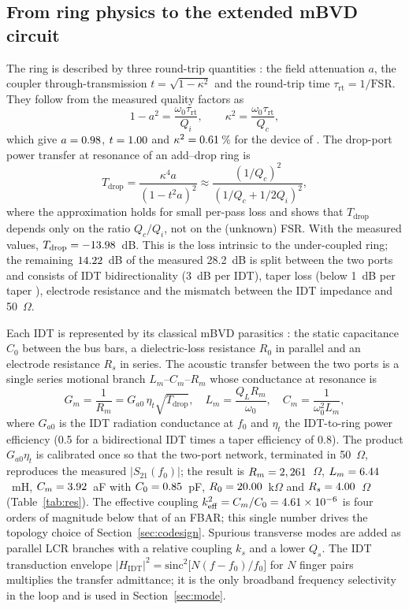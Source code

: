 \documentclass[journal]{IEEEtran}
\begin{document}
\subsection{From ring physics to the extended mBVD circuit}
The ring is described by three round-trip quantities \cite{yariv2000}: the field attenuation $a$, the coupler through-transmission $t=\sqrt{1-\kappa^2}$ and the round-trip time $\tau_{\mathrm{rt}}=1/\mathrm{FSR}$. They follow from the measured quality factors as
\begin{equation}
1-a^2=\frac{\omega_0\tau_{\mathrm{rt}}}{Q_i},\qquad \kappa^2=\frac{\omega_0\tau_{\mathrm{rt}}}{Q_c},
\label{eq:rt}
\end{equation}
which give $a=0.98$, $t=1.00$ and $\kappa^2=0.61$\,\% for the device of \cite{ji2026}. The drop-port power transfer at resonance of an add--drop ring is
\begin{equation}
T_{\mathrm{drop}}=\frac{\kappa^4 a}{(1-t^2a)^2}\approx\frac{(1/Q_c)^2}{(1/Q_c+1/2Q_i)^2},
\label{eq:tdrop}
\end{equation}
where the approximation holds for small per-pass loss and shows that $T_{\mathrm{drop}}$ depends only on the ratio $Q_c/Q_i$, not on the (unknown) FSR. With the measured values, $T_{\mathrm{drop}}=-13.98$~dB. This is the loss intrinsic to the under-coupled ring; the remaining $14.22$~dB of the measured 28.2~dB is split between the two ports and consists of IDT bidirectionality (3~dB per IDT), taper loss (below 1~dB per taper \cite{ji2026}), electrode resistance and the mismatch between the IDT impedance and 50~$\Omega$.

Each IDT is represented by its classical mBVD parasitics \cite{larson2000}: the static capacitance $C_0$ between the bus bars, a dielectric-loss resistance $R_0$ in parallel and an electrode resistance $R_s$ in series. The acoustic transfer between the two ports is a single series motional branch $L_m$--$C_m$--$R_m$ whose conductance at resonance is
\begin{equation}
G_m=\frac{1}{R_m}=G_{a0}\,\eta_t\sqrt{T_{\mathrm{drop}}},\quad L_m=\frac{Q_L R_m}{\omega_0},\quad C_m=\frac{1}{\omega_0^2 L_m},
\label{eq:mbvd}
\end{equation}
where $G_{a0}$ is the IDT radiation conductance at $f_0$ \cite{morgan2007} and $\eta_t$ the IDT-to-ring power efficiency (0.5 for a bidirectional IDT times a taper efficiency of 0.8). The product $G_{a0}\eta_t$ is calibrated once so that the two-port network, terminated in 50~$\Omega$, reproduces the measured $|S_{21}(f_0)|$; the result is $R_m=2,261$~$\Omega$, $L_m=6.44$~mH, $C_m=3.92$~aF with $C_0=0.85$~pF, $R_0=20.00$~k$\Omega$ and $R_s=4.00$~$\Omega$ (Table~\ref{tab:res}). The effective coupling $k_{\mathrm{eff}}^2=C_m/C_0=4.61\times10^{-6}$ is four orders of magnitude below that of an FBAR; this single number drives the topology choice of Section~\ref{sec:codesign}. Spurious transverse modes are added as parallel LCR branches with a relative coupling $k_s$ and a lower $Q_s$. The IDT transduction envelope $|H_{\mathrm{IDT}}|^2=\mathrm{sinc}^2\!\big[N(f-f_0)/f_0\big]$ for $N$ finger pairs \cite{morgan2007} multiplies the transfer admittance; it is the only broadband frequency selectivity in the loop and is used in Section~\ref{sec:mode}.
\end{document}
